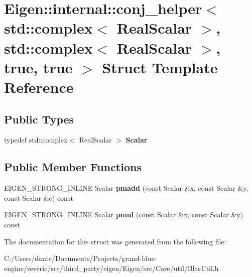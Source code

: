 \hypertarget{struct_eigen_1_1internal_1_1conj__helper_3_01std_1_1complex_3_01_real_scalar_01_4_00_01std_1_1co7e279017f32d052cf58f01f1590ee000}{}\section{Eigen\+::internal\+::conj\+\_\+helper$<$ std\+::complex$<$ Real\+Scalar $>$, std\+::complex$<$ Real\+Scalar $>$, true, true $>$ Struct Template Reference}
\label{struct_eigen_1_1internal_1_1conj__helper_3_01std_1_1complex_3_01_real_scalar_01_4_00_01std_1_1co7e279017f32d052cf58f01f1590ee000}
\subsection*{Public Types}
\begin{DoxyCompactItemize}
\item 
\mbox{\label{struct_eigen_1_1internal_1_1conj__helper_3_01std_1_1complex_3_01_real_scalar_01_4_00_01std_1_1co7e279017f32d052cf58f01f1590ee000_ac76181c3b5e9b918adec8f754cc6df6e}} 
typedef std\+::complex$<$ Real\+Scalar $>$ {\bfseries Scalar}
\end{DoxyCompactItemize}
\subsection*{Public Member Functions}
\begin{DoxyCompactItemize}
\item 
\mbox{\label{struct_eigen_1_1internal_1_1conj__helper_3_01std_1_1complex_3_01_real_scalar_01_4_00_01std_1_1co7e279017f32d052cf58f01f1590ee000_a7bffa756d3773120e9896fe170b2e805}} 
E\+I\+G\+E\+N\+\_\+\+S\+T\+R\+O\+N\+G\+\_\+\+I\+N\+L\+I\+NE Scalar {\bfseries pmadd} (const Scalar \&x, const Scalar \&y, const Scalar \&c) const
\item 
\mbox{\label{struct_eigen_1_1internal_1_1conj__helper_3_01std_1_1complex_3_01_real_scalar_01_4_00_01std_1_1co7e279017f32d052cf58f01f1590ee000_afd1abfeac0df0619345e5e0e58a31782}} 
E\+I\+G\+E\+N\+\_\+\+S\+T\+R\+O\+N\+G\+\_\+\+I\+N\+L\+I\+NE Scalar {\bfseries pmul} (const Scalar \&x, const Scalar \&y) const
\end{DoxyCompactItemize}


The documentation for this struct was generated from the following file\+:\begin{DoxyCompactItemize}
\item 
C\+:/\+Users/dante/\+Documents/\+Projects/grand-\/blue-\/engine/reverie/src/third\+\_\+party/eigen/\+Eigen/src/\+Core/util/Blas\+Util.\+h\end{DoxyCompactItemize}

